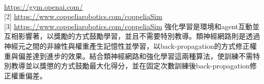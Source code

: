 \begin{flushleft}
{\large {}}\\
\end{flushleft}
\begin{flushleft}\sectionef
[1]\hspace{0.35cm}\href{https://gym.openai.com/}{\underline{https://gym.openai.com/}}\\[12pt]

[2]\hspace{0.35cm} \href{https://www.coppeliarobotics.com/coppeliaSim}{\underline{https://www.coppeliarobotics.com/coppeliaSim}}\\[12pt]


[3]\hspace{0.35cm} \href{https://www.coppeliarobotics.com/coppeliaSim}{\underline{https://www.coppeliarobotics.com/coppeliaSim}} 強化學習是環境和agent互動並互相影響著，以獎勵的方式鼓勵學習，並且不需要特別教導。類神經網路則是透過神經元之間的非線性與權重產生記憶性並學習，以back-propagation的方式修正權重與偏差達到進步的效果。結合類神經網路和強化學習這兩種算法，使訓練不需特別教導並以獎懲的方式鼓勵最大化得分，並在固定次數訓練後back-propagation修正權重偏差。\\[12pt]

\iffalse
\parbox[t][5pt][l]{25pt}{[3]}
\begin{minipage}[t]{15pt}
  \underline{https://gym.openai.com/}
\end{minipage}

\makebox[25pt][l]{[3]}\makebox[45pt][l]{\raisebox{-3ex}[5\height]{\underline{https://gym.openai.com/}https://gym.openai.com/https://gym.openai.com/https://gym.openai.com/https://gym.openai.com/https://gym.openai.com/https://gym.openai.com/}}

\makebox[25pt][l]{[3]}\makebox[45pt][l]{\raisebox{-3ex}[5\height]{\underline{https://gym.openai.com/}}}
\fi
\end{flushleft}
